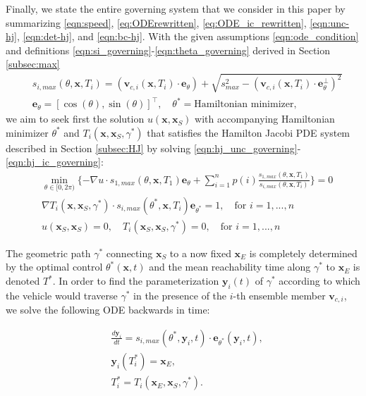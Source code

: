 \documentclass[pdflatex,sn-mathphys-num]{sn-jnl}%
\def \bx{{\mathbf {x}}}
\def \by{{\mathbf {y}}}
\def \bv{{\mathbf {v}}}
\def \be{{\mathbf {e}}}
\theoremstyle{thmstyleone}%
\theoremstyle{thmstyletwo}%
\theoremstyle{thmstylethree}%
\begin{document}
Finally, we state the entire
governing system that we consider in this paper by summarizing \eqref{eqn:speed}, \eqref{eq:ODErewritten}, \eqref{eq:ODE_ic_rewritten}, \eqref{eqn:unc-hj}, \eqref{eqn:det-hj}, and \eqref{eqn:bc-hj}. With the given assumptions \eqref{eqn:ode_condition} and definitions \eqref{eqn:si_governing}-\eqref{eqn:theta_governing} derived in Section \ref{subsec:max} 
\begin{subequations}
\begin{align}
& s_{i,max}(\theta,\bx,T_i) = (\bv_{c,i}(\bx,T_i) \cdot \be_\theta) + \sqrt{s^2_{max} - (\bv_{c,i}(\bx,T_i) \cdot \be_\theta^\perp)^2} \label{eqn:si_governing}\\
& \be_\theta = [\cos(\theta),\sin(\theta)]^\top, \quad \theta^* = \text{Hamiltonian minimizer},
\label{eqn:theta_governing}
\end{align}
\end{subequations}
we aim to seek first the solution $u(\bx,\bx_S)$ with accompanying Hamiltonian minimizer $\theta^*$ and $T_i(\bx,\bx_S,\gamma^*)$ that satisfies the Hamilton Jacobi PDE system described in Section \ref{subsec:HJ} by solving \eqref{eqn:hj_unc_governing}-\eqref{eqn:hj_ic_governing}:  
\begin{subequations}\label{eqn:HJ}
\begin{align}
  & \min_{\theta \in  [0, 2\pi)} \{ -\nabla u \cdot s_{1,max} (\theta, \bx, T_1) \be_\theta + \sum_{i=1}^{n} p(i) \frac{s_{1,max} (\theta, \bx, T_1)}{s_{i,max} (\theta, \bx, T_i)} \} = 0 \label{eqn:hj_unc_governing}\\
    & \nabla T_i(\bx,\bx_S,\gamma^*) \cdot s_{i,max}(\theta^*,\bx, T_i)\be_{\theta^*} = 1 , \quad \text{for } i=1,...,n \label{eqn:hj_det_governing}\\
    & u(\bx_S,\bx_S) = 0 , \quad T_i(\bx_S,\bx_S,\gamma^*) = 0, \quad \text{for } i=1,...,n \label{eqn:hj_ic_governing}
\end{align}
\end{subequations}

The geometric path $\gamma^*$ connecting $\bx_S$ to a now fixed $\bx_E$ is completely determined by the optimal control $\theta^*(\bx,t)$ and the mean reachability time along $\gamma^*$ to $\bx_E$ is denoted $T^*$.  In order to find the parameterization $\by_i(t)$ of $\gamma^*$ according to which the vehicle would traverse $\gamma^*$ in the presence of the  $i$-th ensemble member $\bv_{c,i}$, we solve the following ODE backwards in time:

\begin{subequations}\label{eqn:ODE}


\begin{align}
    & \frac{d\by_i}{dt} = s_{i,max}(\theta^*,\by_i,t)\cdot \be_{\theta^*}(\by_i,t), \label{eqn:ode_governing}\\ 
    &\by_i(T_i^*)=\bx_E, \label{eqn:optimal_control} \\
    &T_i^*=T_i(\bx_E, \bx_S,\gamma^*).
    \label{eqn:optimal_control_2}
\end{align}

\end{subequations}
\end{document}
